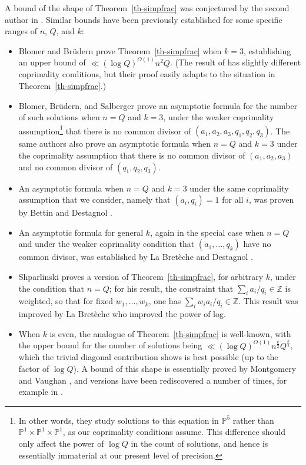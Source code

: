 \documentclass[11pt,letterpaper]{amsart}
\theoremstyle{definition}
\begin{document}
A bound of the shape of Theorem~\ref{th-simpfrac} was conjectured by the second author in \cite[Conjecture 6.2]{K21}. Similar bounds have been previously established for some specific ranges of $n$, $Q$, and $k$:
\begin{itemize}
    \item Blomer and Br\"{u}dern \cite[Lemma 3]{BB} prove Theorem~\ref{th-simpfrac} when $k=3$, establishing an upper bound of $\ll (\log Q)^{O(1)}n^2Q$. (The result of \cite{BB} has slightly different coprimality conditions, but their proof easily adapts to the situation in Theorem~\ref{th-simpfrac}.)
    \item Blomer, Br\"{u}dern, and Salberger \cite{BBS} prove an asymptotic formula for the number of such solutions when $n=Q$ and $k=3$, under the weaker coprimality assumption\footnote{In other words, they study solutions to this equation in $\mathbb{P}^5$ rather than $\mathbb{P}^1\times \mathbb{P}^1\times \mathbb{P}^1$, as our coprimality conditions assume. This difference should only affect the power of $\log Q$ in the count of solutions, and hence is essentially immaterial at our present level of precision.} that there is no common divisor of $(a_1,a_2,a_3,q_1,q_2,q_3)$. The same authors \cite{BBS18} also prove an asymptotic formula when $n=Q$ and $k=3$ under the coprimality assumption that there is no common divisor of $(a_1,a_2,a_3)$ and no common divisor of $(q_1,q_2,q_3)$. 
    \item An asymptotic formula when $n = Q$ and $k = 3$ under the same coprimality assumption that we consider, namely that $(a_i,q_i) = 1$ for all $i$, was proven by Bettin and Destagnol \cite{BD}.
    \item An asymptotic formula for general $k$, again in the special case when $n=Q$ and under the weaker coprimality condition that $(a_1,\ldots,q_k)$ have no common divisor, was established by La Bret\`eche \cite{dlB} and Destagnol \cite{De}.
    \item Shparlinski \cite{Shpar} proves a version of Theorem~\ref{th-simpfrac}, for arbitrary $k$, under the condition that $n = Q$; for his result, the constraint that $\sum_i a_i/q_i \in \mathbb Z$ is weighted, so that for fixed $w_1, \ldots, w_k$, one has $\sum_i w_i a_i/q_i \in \mathbb Z$. This result was improved by La Bret\`eche \cite{dlB} who improved the power of log.
    \item When $k$ is even, the analogue of Theorem~\ref{th-simpfrac} is well-known, with the upper bound for the number of solutions being $\ll (\log Q)^{O(1)}n^{\frac{k}{2}}Q^{\frac{k}{2}}$, which the trivial diagonal contribution shows is best possible (up to the factor of $\log Q$). A bound of this shape is essentially proved by Montgomery and Vaughan \cite{MV86}, and versions have been rediscovered a number of times, for example in \cite[Lemma 5]{BDFKK}.

\end{itemize}
\end{document}
